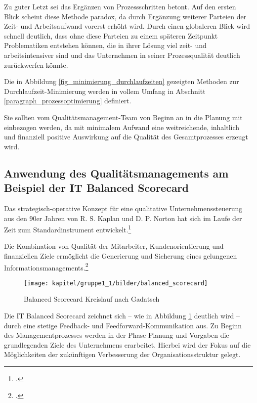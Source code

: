 Zu guter Letzt sei das Ergänzen von Prozessschritten betont. Auf den ersten Blick scheint diese Methode paradox, da durch Ergänzung weiterer Parteien der Zeit- und Arbeitsaufwand vorerst erhöht wird. Durch einen globaleren Blick wird schnell deutlich, dass ohne diese Parteien zu einem späteren Zeitpunkt Problematiken entstehen können, die in ihrer Lösung viel zeit- und arbeitsintensiver sind und das Unternehmen in seiner Prozessqualität deutlich zurückwerfen könnte.

Die in Abbildung \ref{fig_minimierung_durchlaufzeiten} gezeigten Methoden zur Durchlaufzeit-Minimierung werden in vollem Umfang in Abschnitt \ref{paragraph_prozessoptimierung} definiert.

Sie sollten vom Qualitätsmanagement-Team von Beginn an in die Planung mit einbezogen werden, da mit minimalem Aufwand eine weitreichende, inhaltlich und finanziell positive Auswirkung auf die Qualität des Gesamtprozesses erzeugt wird. 

\subsection{Anwendung des Qualitätsmanagements am Beispiel der IT Balanced Scorecard}
\label{subsection_anwendung_it_balanced_scorecard}
Das strategisch-operative Konzept für eine qualitative Unternehmenssteuerung aus den 90er Jahren 
von R. S. Kaplan und D. P. Norton hat sich im Laufe der Zeit zum Standardinstrument 
entwickelt.\footcite{friedag_scorecard_2004}

Die Kombination von Qualität der Mitarbeiter, Kundenorientierung und finanziellen Ziele ermöglicht die 
Generierung und Sicherung eines gelungenen Informationsmanagements.\footcite{gabriel_inm_2003}

\begin{figure}[h!]
	\centering
	\texttt{[image: kapitel/gruppe1\_1/bilder/balanced\_scorecard]}
	\caption{Balanced Scorecard Kreislauf nach Gadatsch\protect\footnotemark}
	\label{fig_balanced_scorecard_cycle}
\end{figure}
\newpage

Die IT Balanced Scorecard zeichnet sich – wie in Abbildung \ref{fig_balanced_scorecard_cycle} deutlich wird – durch eine stetige Feedback- und Feedforward-Kommunikation aus. 
Zu Beginn des Managementprozesses werden in der Phase \glqq Planung und Vorgaben\grqq{} die 
grundlegenden Ziele des Unternehmens erarbeitet. Hierbei wird der Fokus auf die Möglichkeiten der 
zukünftigen Verbesserung der Organisationsstruktur gelegt.

